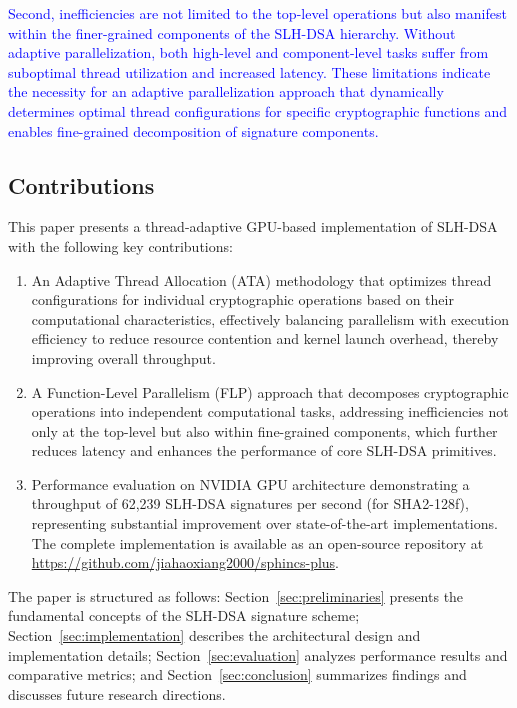 \documentclass[journal]{IEEEtran}
\begin{document}
\textcolor{blue}{Second, inefficiencies are not limited to the top-level operations but also manifest within the finer-grained components of the SLH-DSA hierarchy. Without adaptive parallelization, both high-level and component-level tasks suffer from suboptimal thread utilization and increased latency. These limitations indicate the necessity for an adaptive parallelization approach that dynamically determines optimal thread configurations for specific cryptographic functions and enables fine-grained decomposition of signature components.}

\subsection{Contributions}

This paper presents a thread-adaptive GPU-based implementation of SLH-DSA with the following key contributions:

\begin{enumerate}
  \color{blue}
  \item An Adaptive Thread Allocation (ATA) methodology that optimizes thread configurations for individual cryptographic operations based on their computational characteristics, effectively balancing parallelism with execution efficiency to reduce resource contention and kernel launch overhead, thereby improving overall throughput.

  \item A Function-Level Parallelism (FLP) approach that decomposes cryptographic operations into independent computational tasks, addressing inefficiencies not only at the top-level but also within fine-grained components, which further reduces latency and enhances the performance of core SLH-DSA primitives.
  \color{black}
  \item Performance evaluation on NVIDIA GPU architecture demonstrating a throughput of 62,239 SLH-DSA signatures per second (for SHA2-128f), representing substantial improvement over state-of-the-art implementations.
    The complete implementation is available as an open-source repository at \url{https://github.com/jiahaoxiang2000/sphincs-plus}.
\end{enumerate}

The paper is structured as follows: Section~\ref{sec:preliminaries} presents the fundamental concepts of the SLH-DSA signature scheme; Section~\ref{sec:implementation} describes the architectural design and implementation details; Section~\ref{sec:evaluation} analyzes performance results and comparative metrics; and Section~\ref{sec:conclusion} summarizes findings and discusses future research directions.
\end{document}
